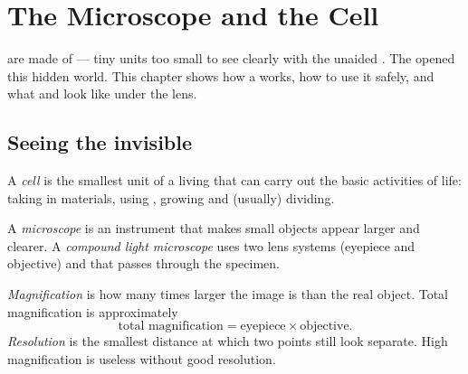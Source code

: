 \chapter{The Microscope and the Cell}\label{ch:g7:microscope}

 are made of \emph{} --- tiny units too small to see
clearly with the unaided . The  opened this
hidden world. This chapter shows how a  works, how to use it
safely, and what  and   look like under the lens.

\section{Seeing the invisible}

\begin{definition}[Cell]\label{def:g7:microscope:cell}
A \emph{cell} is the smallest unit of a living  that
can carry out the basic activities of life: taking in materials, using
, growing and (usually) dividing.
\end{definition}

\begin{definition}[Microscope]\label{def:g7:microscope:scope}
A \emph{microscope} is an instrument that makes small
objects appear larger and clearer. A \emph{compound light
microscope} uses two lens systems
(eyepiece and objective) and  that passes through the specimen.
\end{definition}


\begin{definition}\label{def:g7:microscope:mag}
\emph{Magnification} is how many times larger the
image is than the real object. Total magnification is approximately
\[
\text{total magnification} = \text{eyepiece} \times \text{objective}.
\]
\emph{Resolution} is the smallest distance
at which two points still look separate. High magnification is useless
without good resolution.
\end{definition}

